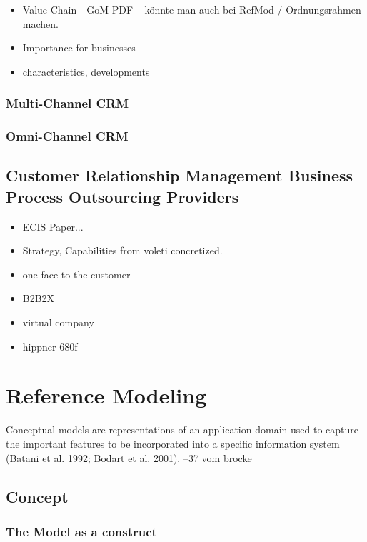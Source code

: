 				\begin{itemize}
		
			\item Value Chain - GoM PDF -- könnte man auch bei RefMod / Ordnungsrahmen machen. 			
			\item Importance for businesses
			\item characteristics, developments 
		\end{itemize}
	
	\subsubsection{Multi-Channel CRM}
	\subsubsection{Omni-Channel CRM}
	 
		\subsection{Customer Relationship Management Business Process Outsourcing Providers}
		\begin{itemize}
			\item ECIS Paper...
			\item Strategy, Capabilities from voleti concretized. 
			\item one face to the customer
			\item B2B2X
			\item virtual company
			\item hippner 680f
		\end{itemize}
	\section{Reference Modeling}
	\label{sec:03_refmod}
		
Conceptual models are representations of an application domain used to capture the important features to be incorporated into a specific information system (Batani et al. 1992; Bodart et al. 2001). --37 vom brocke


		\subsection{Concept}
		
		\subsubsection{The Model as a construct}
		
